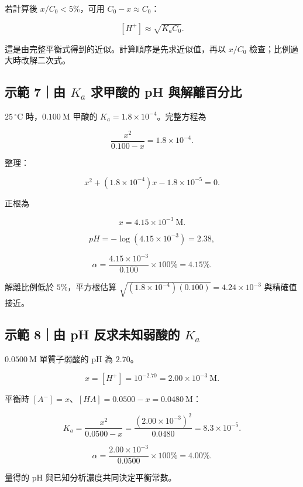 \documentclass[11pt,a4paper]{article}
\begin{document}
若計算後 \(x/C_0<5\%\)，可用 \(C_0-x\approx C_0\)：

\[
[H^+]\approx\sqrt{K_aC_0}.
\]

這是由完整平衡式得到的近似。計算順序是先求近似值，再以 \(x/C_0\) 檢查；比例過大時改解二次式。

\begin{HandoutWorkedExample}

\subsection{\texorpdfstring{示範 7｜由 \(K_a\) 求甲酸的 pH 與解離百分比}{示範 7｜由 K\_a 求甲酸的 pH 與解離百分比}}\label{ux793aux7bc4-7ux7531-k_a-ux6c42ux7532ux9178ux7684-ph-ux8207ux89e3ux96e2ux767eux5206ux6bd4}

\(25\,^\circ\mathrm C\) 時，\(0.100\ \mathrm M\) 甲酸的 \(K_a=1.8\times10^{-4}\)。完整方程為

\[
\frac{x^2}{0.100-x}=1.8\times10^{-4}.
\]

整理：

\[
x^2+(1.8\times10^{-4})x-1.8\times10^{-5}=0.
\]

正根為

\[
x=4.15\times10^{-3}\ \mathrm M.
\]

\[
pH=-\log(4.15\times10^{-3})=2.38,
\]

\[
\alpha=\frac{4.15\times10^{-3}}{0.100}\times100\%=4.15\%.
\]

解離比例低於 \(5\%\)，平方根估算 \(\sqrt{(1.8\times10^{-4})(0.100)}=4.24\times10^{-3}\) 與精確值接近。

\end{HandoutWorkedExample}

\begin{HandoutWorkedExample}

\subsection{\texorpdfstring{示範 8｜由 pH 反求未知弱酸的 \(K_a\)}{示範 8｜由 pH 反求未知弱酸的 K\_a}}\label{ux793aux7bc4-8ux7531-ph-ux53cdux6c42ux672aux77e5ux5f31ux9178ux7684-k_a}

\(0.0500\ \mathrm M\) 單質子弱酸的 pH 為 \(2.70\)。

\[
x=[H^+]=10^{-2.70}=2.00\times10^{-3}\ \mathrm M.
\]

平衡時 \([A^-]=x\)、\([HA]=0.0500-x=0.0480\ \mathrm M\)：

\[
K_a=\frac{x^2}{0.0500-x}
=\frac{(2.00\times10^{-3})^2}{0.0480}
=8.3\times10^{-5}.
\]

\[
\alpha=\frac{2.00\times10^{-3}}{0.0500}\times100\%=4.00\%.
\]

量得的 pH 與已知分析濃度共同決定平衡常數。

\end{HandoutWorkedExample}
\end{document}
